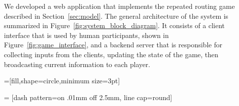 \documentclass{sig-alternate-ipsn13}
\begin{document}
We developed a web application that implements the repeated routing game described in Section~\ref{sec:model}. The general architecture of the system is summarized in Figure~\ref{fig:system_block_diagram}. It consists of a client interface that is used by human participants, shown in Figure~\ref{fig:game_interface}, and a backend server that is responsible for collecting inputs from the clients, updating the state of the game, then broadcasting current information to each player.


%
%
%

 \def\radius{.7mm}
 =[fill,shape=circle,minimum size=3pt]

= [dash pattern=on .01mm off 2.5mm,
                                         line cap=round]
\end{document}
